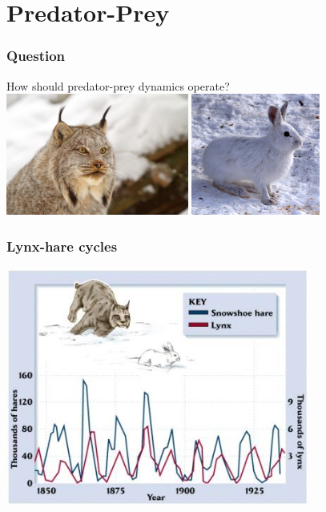 \documentclass[color=usenames,dvipsnames]{beamer}\usepackage[]{graphicx}\usepackage[]{xcolor}
\begin{document}
\section{Predator-Prey}



\begin{frame}
  \frametitle{Question}
  \Large
  How should predator-prey dynamics operate? \\
  \pause
  \vspace{1cm}  \includegraphics[height=4cm,keepaspectratio]{figs/Canada_lynx_portrait_by_Michael_Zahra} \hfill
\includegraphics[height=4cm,keepaspectratio]{figs/Snowshoe_Hare,_Shirleys_Bay}
\end{frame}




\begin{frame}
  \frametitle{Lynx-hare cycles}
  \centering
  \includegraphics[width=0.75\textwidth]{figs/lynx-hare} \par
\end{frame}
\end{document}
